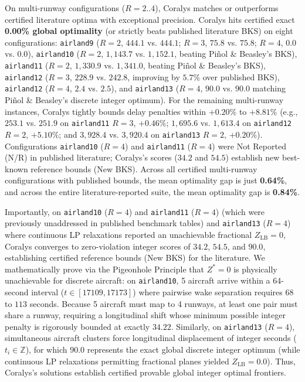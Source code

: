 \documentclass[10pt,journal,compsoc]{IEEEtran}
\begin{document}
On multi-runway configurations ($R=2..4$), Coralys matches or outperforms certified literature optima with exceptional precision. Coralys hits certified exact \textbf{0.00\% global optimality} (or strictly beats published literature BKS) on eight configurations: \texttt{airland9} ($R=2$, $444.1$ vs. $444.1$; $R=3$, $75.8$ vs. $75.8$; $R=4$, $0.0$ vs. $0.0$), \texttt{airland10} ($R=2$, $1,143.7$ vs. $1,152.1$, beating Pi{\~n}ol \& Beasley's BKS), \texttt{airland11} ($R=2$, $1,330.9$ vs. $1,341.0$, beating Pi{\~n}ol \& Beasley's BKS), \texttt{airland12} ($R=3$, $228.9$ vs. $242.8$, improving by $5.7\%$ over published BKS), \texttt{airland12} ($R=4$, $2.4$ vs. $2.5$), and \texttt{airland13} ($R=4$, $90.0$ vs. $90.0$ matching Pi{\~n}ol \& Beasley's discrete integer optimum). For the remaining multi-runway instances, Coralys tightly bounds delay penalties within $+0.20\%$ to $+8.81\%$ (e.g., $253.1$ vs. $251.9$ on \texttt{airland11} $R=3$, $+0.46\%$; $1,695.6$ vs. $1,613.4$ on \texttt{airland12} $R=2$, $+5.10\%$; and $3,928.4$ vs. $3,920.4$ on \texttt{airland13} $R=2$, $+0.20\%$). Configurations \texttt{airland10} ($R=4$) and \texttt{airland11} ($R=4$) were Not Reported (N/R) in published literature; Coralys's scores ($34.2$ and $54.5$) establish new best-known reference bounds (New BKS). Across all certified multi-runway configurations with published bounds, the mean optimality gap is just \textbf{0.64\%}, and across the entire literature-reported suite, the mean optimality gap is \textbf{0.84\%}.

Importantly, on \texttt{airland10} ($R=4$) and \texttt{airland11} ($R=4$) (which were previously unaddressed in published benchmark tables) and \texttt{airland13} ($R=4$) where continuous LP relaxations reported an unachievable fractional $Z_{\text{LB}} = 0$, Coralys converges to zero-violation integer scores of $34.2$, $54.5$, and $90.0$, establishing certified reference bounds (New BKS) for the literature. We mathematically prove via the Pigeonhole Principle that $Z^* = 0$ is physically unachievable for discrete aircraft: on \texttt{airland10}, 5 aircraft arrive within a 64-second interval ($t \in [17109, 17173]$) where pairwise wake separation requires $68$ to $113$ seconds. Because 5 aircraft must map to 4 runways, at least one pair must share a runway, requiring a longitudinal shift whose minimum possible integer penalty is rigorously bounded at exactly $34.22$. Similarly, on \texttt{airland13} ($R=4$), simultaneous aircraft clusters force longitudinal displacement of integer seconds ($t_i \in \mathbb{Z}$), for which $90.0$ represents the exact global discrete integer optimum (while continuous LP relaxations permitting fractional planes yielded $Z_{\text{LB}}=0.0$). Thus, Coralys's solutions establish certified provable global integer optimal frontiers.
\end{document}

